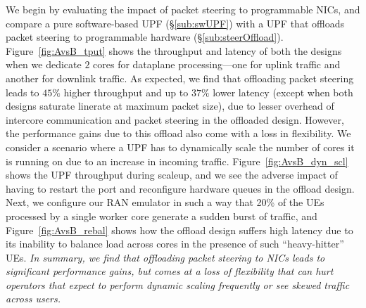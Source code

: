  We begin by evaluating the impact of packet steering to programmable NICs, and compare a pure software-based UPF (\S\ref{sub:swUPF}) with a UPF that offloads packet steering to programmable hardware (\S\ref{sub:steerOffload}). Figure~\ref{fig:AvsB_tput} shows the throughput and latency of both the designs when we dedicate $2$ cores for dataplane processing---one for uplink traffic and another for downlink traffic. As expected, we find that offloading packet steering leads to $45 \%$ higher throughput and up to $37 \%$ lower latency (except when both designs saturate linerate at maximum packet size), due to lesser overhead of intercore communication and packet steering in the offloaded design. However, the performance gains due to this offload also come with a loss in flexibility. We consider a scenario where a UPF has to dynamically scale the number of cores it is running on due to an increase in incoming traffic. Figure~\ref{fig:AvsB_dyn_scl} shows the UPF throughput during scaleup, and we see the adverse impact of having to restart the port and reconfigure hardware queues in the offload design. Next, we configure our RAN emulator in such a way that 20\% of the UEs processed by a single worker core generate a sudden burst of traffic, and Figure~\ref{fig:AvsB_rebal} shows how the offload design suffers high latency due to its inability to balance load across cores in the presence of such ``heavy-hitter'' UEs. {\em In summary, we find that offloading packet steering to NICs leads to significant performance gains, but comes at a loss of flexibility that can hurt operators that expect to perform dynamic scaling frequently or see skewed traffic across users. }
